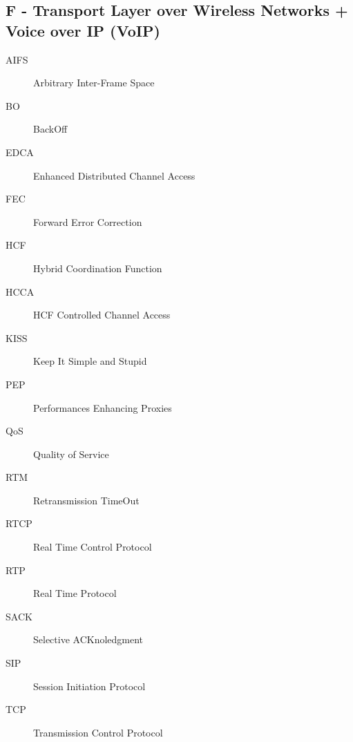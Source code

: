 \documentclass[twocolumn]{article}
\begin{document}
\begin{spacing}{0.5}
\section*{F - Transport Layer over Wireless Networks + Voice over IP (VoIP)}
\begin{description}
\item[AIFS]Arbitrary Inter-Frame Space
\item[BO]BackOff
\item[EDCA]Enhanced Distributed Channel Access
\item[FEC]Forward Error Correction
\item[HCF]Hybrid Coordination Function
\item[HCCA]HCF Controlled Channel Access
\item[KISS]Keep It Simple and Stupid
\item[PEP]Performances Enhancing Proxies
\item[QoS]Quality of Service
\item[RTM]Retransmission TimeOut
\item[RTCP]Real Time Control Protocol
\item[RTP]Real Time Protocol
\item[SACK]Selective ACKnoledgment 
\item[SIP]Session Initiation Protocol
\item[TCP]Transmission Control Protocol
\end{description}

\end{spacing}
\end{document}
